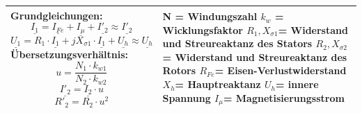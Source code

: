 \begin{longtable}{| p{} | p{}|}
    \hline
    \textbf{Grundgleichungen:}\newline
    \[ \underline{I_1}= \underline{I_{Fe}}+\underline{I_\mu}+\underline{I'_2} \approx \underline{I'_2} \]
    \[ \underline{U_1}= R_1 \cdot \underline{I_1}+jX_{\sigma 1}\cdot \underline{I_1}+ \underline{U_h} \approx \underline{U_h} \]
    \textbf{Übersetzungsverhältnis:}\newline
    \[ u=\frac{N_1 \cdot k_{w1}}{N_2 \cdot k_{w2}}\]
    \[ \underline{I'_2}=\underline{I_2} \cdot u \]
    \[ R'_2 = R_2 \cdot u^2 \]\vspace{-0.3cm}&
    N = Windungszahl \newline
    $ k_w $ = Wicklungsfaktor \newline
    $ R_1, X_{\sigma 1} $= Widerstand und Streureaktanz des Stators \newline
    $ R_2, X_{\sigma 2} $= Widerstand und Streureaktanz des Rotors \newline
    $ R_{Fe} $= Eisen-Verlustwiderstand \newline
    $ X_h $= Hauptreaktanz \newline
    $ U_h $= innere Spannung \newline
    $ I_\mu $= Magnetisierungsstrom
    \\ \hline      
\end{longtable}

